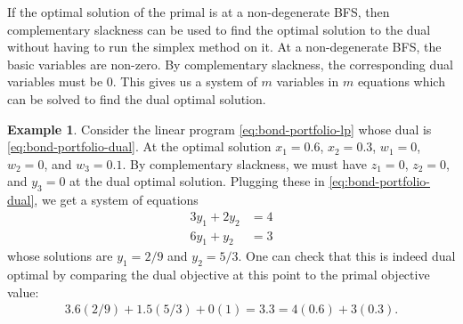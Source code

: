 \documentclass[
]{book}
\theoremstyle{definition}
\theoremstyle{definition}
\newtheorem{example}{Example}[chapter]
\theoremstyle{definition}
\theoremstyle{definition}
\theoremstyle{remark}
\begin{document}
If the optimal solution of the primal is at a non-degenerate BFS, then complementary slackness can
be used to find the optimal solution to the dual without having to run the simplex method on it. At
a non-degenerate BFS, the basic variables are non-zero. By complementary slackness, the
corresponding dual variables must be 0. This gives us a system of \(m\) variables in \(m\) equations
which can be solved to find the dual optimal solution.

\begin{example}
Consider the linear program \eqref{eq:bond-portfolio-lp} whose dual is \eqref{eq:bond-portfolio-dual}.
At the optimal solution \(x_1 = 0.6\), \(x_2 = 0.3\), \(w_1 = 0\), \(w_2 = 0\), and \(w_3 = 0.1\). By
complementary slackness, we must have \(z_1 = 0\), \(z_2 = 0\), and \(y_3 = 0\) at the dual optimal
solution. Plugging these in \eqref{eq:bond-portfolio-dual}, we get a system of equations
\begin{align*}
  3y_1 + 2y_2 &= 4 \\
  6y_1 + y_2 &= 3 
\end{align*}
whose solutions are \(y_1 = 2/9\) and \(y_2 = 5/3\).
One can check that this is indeed dual optimal by comparing the dual objective at this point to the
primal objective value:
\begin{align*}
  3.6 (2/9) + 1.5 (5/3) + 0 (1) = 3.3 = 4 (0.6) + 3 (0.3).
\end{align*}
\end{example}
\end{document}
